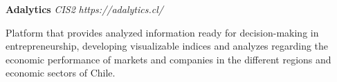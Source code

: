 \item
\headerrow
{\textbf{Adalytics}}
{\emph{}}
\headerrow
{\emph{CIS2}}
{\emph{https://adalytics.cl/}}
\begin{itemize*}
    \item Platform that provides analyzed information ready for decision-making 
    in entrepreneurship, developing visualizable indices and analyzes regarding 
    the economic performance of markets and companies in the different regions 
    and economic sectors of Chile.
\end{itemize*}